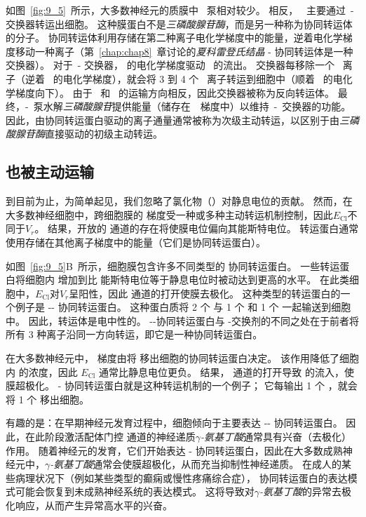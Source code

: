 如图~\ref{fig:9_5}~所示，大多数神经元的质膜中~ 泵相对较少。
相反，~ 主要通过~-~ 交换器转运出细胞。
这种膜蛋白不是\textit{三磷酸腺苷酶}，而是另一种称为协同转运体的分子。
协同转运体利用存储在第二种离子电化学梯度中的能量，逆着电化学梯度移动一种离子（第~\ref{chap:chap8}~章讨论的\textit{夏科雷登氏结晶} - 协同转运体是一种交换器）。
对于~- 交换器， 的电化学梯度驱动~ 的流出。
交换器每移除一个~ 离子（逆着~ 的电化学梯度），就会将 3 到 4 个~ 离子转运到细胞中（顺着~ 的电化学梯度向下）。
由于~ 和~ 的运输方向相反，因此交换器被称为反向转运体。
最终，-~泵水解\textit{三磷酸腺苷}提供能量（储存在~~梯度中）以维持~-~交换器的功能。
因此，由协同转运蛋白驱动的离子通量通常被称为次级主动转运，以区别于由\textit{三磷酸腺苷酶}直接驱动的初级主动转运。



\subsection{ 也被主动运输}
到目前为止，为简单起见，我们忽略了氯化物（）对静息电位的贡献。
然而，在大多数神经细胞中，跨细胞膜的  梯度受一种或多种主动转运机制控制，因此$E_\text{Cl}$不同于$V_r$。
结果，开放的  通道的存在将使膜电位偏向其能斯特电位。
 转运蛋白通常使用存储在其他离子梯度中的能量（它们是协同转运蛋白）。


如图~\ref{fig:9_5}B~所示，细胞膜包含许多不同类型的  协同转运蛋白。
一些转运蛋白将细胞内  增加到比  能斯特电位等于静息电位时被动达到更高的水平。
在此类细胞中，$E_\text{Cl}$对$V_r$呈阳性，因此  通道的打开使膜去极化。
这种类型的转运蛋白的一个例子是 -- 协同转运蛋白。
这种蛋白质将 2 个  与 1 个  和 1 个  一起输送到细胞中。
因此，转运体是电中性的。
--协同转运蛋白与 -交换剂的不同之处在于前者将所有 3 种离子沿同一方向转运，即它是一种协同转运蛋白。


在大多数神经元中， 梯度由将  移出细胞的协同转运蛋白决定。
该作用降低了细胞内  的浓度，因此 $E_\text{Cl}$ 通常比静息电位更负。
结果， 通道的打开导致  的流入，使膜超极化。
- 协同转运蛋白就是这种转运机制的一个例子；
它每输出 1 个 ，就会将 1 个  移出细胞。


有趣的是：在早期神经元发育过程中，细胞倾向于主要表达 -- 协同转运蛋白。
因此，在此阶段激活配体门控  通道的神经递质\textit{$\gamma$-氨基丁酸}通常具有兴奋（去极化）作用。 
随着神经元的发育，它们开始表达 - 协同转运蛋白，因此在大多数成熟神经元中，\textit{$\gamma$-氨基丁酸}通常会使膜超极化，从而充当抑制性神经递质。 
在成人的某些病理状况下（例如某些类型的癫痫或慢性疼痛综合症）， 协同转运蛋白的表达模式可能会恢复到未成熟神经系统的表达模式。
这将导致对\textit{$\gamma$-氨基丁酸}的异常去极化响应，从而产生异常高水平的兴奋。



